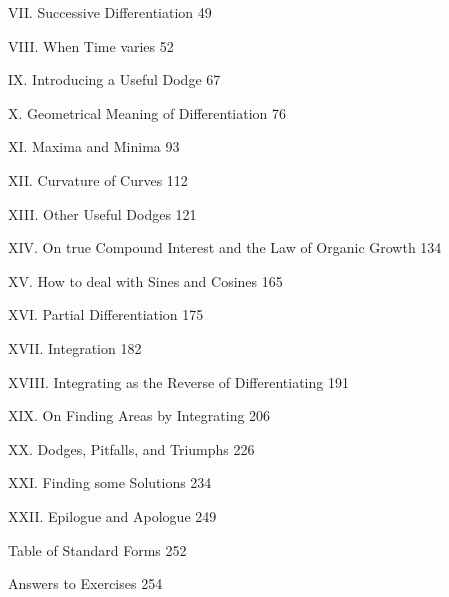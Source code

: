     VII. Successive Differentiation  49
    
    VIII. When Time varies   52
    
    IX. Introducing a Useful Dodge  67
    
    X. Geometrical Meaning of Differentiation 76
    
    XI. Maxima and Minima   93
    
    XII. Curvature of Curves   112
    
    XIII. Other Useful Dodges   121
    
    XIV. On true Compound Interest and the Law of
    Organic Growth   134
    
    XV. How to deal with Sines and Cosines  165
    
    XVI. Partial Differentiation  175
    
    XVII. Integration     182
    
    
    XVIII. Integrating as the Reverse of Differentiating  191
    
    XIX. On Finding Areas by Integrating  206
    
    XX. Dodges, Pitfalls, and Triumphs   226
    
    XXI. Finding some Solutions  234
    
    XXII. Epilogue and Apologue  249
    
    Table of Standard Forms    252
    
    Answers to Exercises  254
    
    \fi%


    

    
    
    
    
    
    
    
    
    
    
    
    
    
    
    
    
    
    
    
    
    
    
    
